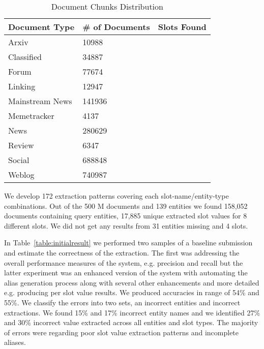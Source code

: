 \begin{table}
\caption{Document Chunks Distribution }
\centering
\label{table:documentsDist}

\begin{tabular}{|l|l|c|}
\hline 
\textbf{Document Type} & \textbf{\# of Documents} &  \textbf{Slots Found}\\ 
\hline 
Arxiv & 10988 & \\ \hline
 Classified & 34887 & \\ \hline
 Forum & 77674 & \\ \hline
 Linking & 12947 & \\ \hline
 Mainstream News & 141936 & \\ \hline
 Memetracker & 4137 & \\ \hline
 News & 280629 & \\ \hline
 Review & 6347 & \\ \hline
 Social & 688848 & \\ \hline
 Weblog & 740987 & \\ \hline
\hline 
\end{tabular} 
\end{table}


 
 
 
We develop 172 extraction patterns covering each slot-name/entity-type combinations.
Out of the 500 M documents and 139 entities we found 158,052 documents containing query entities, 17,885 unique extracted slot values for 8 different slots.
We did not get any results from 31 entities missing and 4 slots.

In Table~\ref{table:initialresult} we performed two samples of a baseline submission and estimate the correctness of the extraction.
The first was addressing the overall performance measures of the system, e.g. precision and recall but the latter experiment was an enhanced version of the system with automating the alias generation process along with several other enhancements and more detailed e.g. producing per slot value results. 
We produced accuracies in range of  54\% and 55\%.
We classify the errors into two sets, an incorrect entities and incorrect extractions.
We found 15\% and 17\% incorrect entity names and we identified 27\% and 30\% incorrect value extracted across all entities and slot types.
The majority of errors were regarding poor slot value extraction patterns and incomplete aliases.

